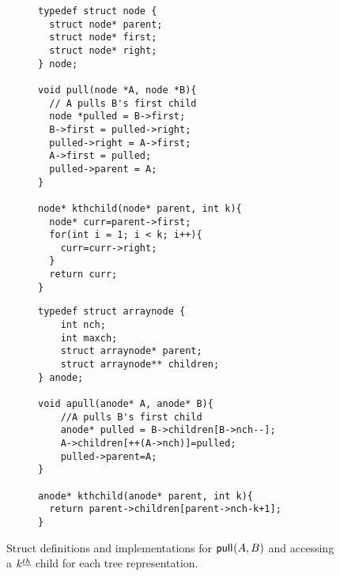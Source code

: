 \begin{figure}[H]
    \begin{subfigure}[t]{.5 \textwidth}
	\begin{center}

	    \begin{Verbatim}
typedef struct node {
  struct node* parent;
  struct node* first;
  struct node* right;
} node;

void pull(node *A, node *B){ 
  // A pulls B's first child
  node *pulled = B->first;
  B->first = pulled->right;
  pulled->right = A->first;
  A->first = pulled;
  pulled->parent = A;
}

node* kthchild(node* parent, int k){
  node* curr=parent->first;
  for(int i = 1; i < k; i++){
    curr=curr->right;
  }
  return curr;
}
\end{Verbatim}
	\end{center}
	\label{fig:}
    \end{subfigure}
    \begin{subfigure}[t]{.5 \textwidth}
	\begin{center}

	    \begin{Verbatim}
typedef struct arraynode {
    int nch; 
    int maxch;
    struct arraynode* parent;
    struct arraynode** children;
} anode;

void apull(anode* A, anode* B){ 
    //A pulls B's first child
    anode* pulled = B->children[B->nch--];
    A->children[++(A->nch)]=pulled;
    pulled->parent=A;
}

anode* kthchild(anode* parent, int k){
  return parent->children[parent->nch-k+1];
}
	    \end{Verbatim}
	\end{center}
	\label{fig:}
    \end{subfigure}

    \cprotect\caption{Struct definitions and implementations for $\mathsf{pull}_{}(A,B)$ and accessing a $k^{\underline{th}}$ child for each tree representation.}
    \label{fig:otreeStarter}
\end{figure}


